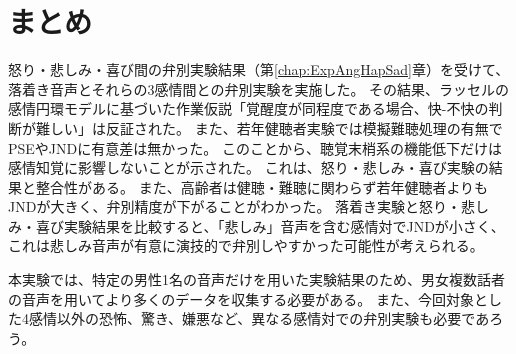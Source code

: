 


\section{まとめ}
怒り・悲しみ・喜び間の弁別実験結果（第\ref{chap:ExpAngHapSad}章）を受けて、落着き音声とそれらの3感情間との弁別実験を実施した。
その結果、ラッセルの感情円環モデルに基づいた作業仮説「覚醒度が同程度である場合、快-不快の判断が難しい」は反証された。
また、若年健聴者実験では模擬難聴処理の有無でPSEやJNDに有意差は無かった。
このことから、聴覚末梢系の機能低下だけは感情知覚に影響しないことが示された。
これは、怒り・悲しみ・喜び実験の結果と整合性がある。
また、高齢者は健聴・難聴に関わらず若年健聴者よりもJNDが大きく、弁別精度が下がることがわかった。
落着き実験と怒り・悲しみ・喜び実験結果を比較すると、「悲しみ」音声を含む感情対でJNDが小さく、
これは悲しみ音声が有意に演技的で弁別しやすかった可能性が考えられる。

本実験では、特定の男性1名の音声だけを用いた実験結果のため、男女複数話者の音声を用いてより多くのデータを収集する必要がある。
また、今回対象とした4感情以外の恐怖、驚き、嫌悪など、異なる感情対での弁別実験も必要であろう。




